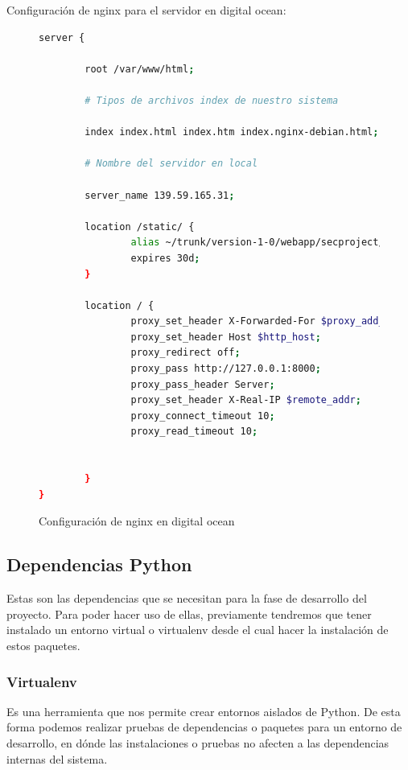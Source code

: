 Configuración de nginx para el servidor en digital ocean:

\begin{figure}[H]
\begin{lstlisting}[language=bash]
server {

        root /var/www/html;

        # Tipos de archivos index de nuestro sistema

        index index.html index.htm index.nginx-debian.html;

        # Nombre del servidor en local

        server_name 139.59.165.31;

        location /static/ {
                alias ~/trunk/version-1-0/webapp/secproject/static/;
                expires 30d;
        }

        location / {
                proxy_set_header X-Forwarded-For $proxy_add_x_forwarded_for;
                proxy_set_header Host $http_host;
                proxy_redirect off;
                proxy_pass http://127.0.0.1:8000;
                proxy_pass_header Server;
                proxy_set_header X-Real-IP $remote_addr;
                proxy_connect_timeout 10;
                proxy_read_timeout 10;


        }
}
\end{lstlisting}
\caption{Configuración de nginx en digital ocean}
\end{figure}

\subsection{Dependencias Python}

Estas son las dependencias que se necesitan para la fase de desarrollo del proyecto. Para poder hacer uso de ellas, previamente tendremos que tener instalado un entorno virtual o virtualenv desde el cual hacer la instalación de estos paquetes.

\subsubsection{Virtualenv}

Es una herramienta que nos permite crear entornos aislados de Python. De esta forma podemos realizar pruebas de dependencias o paquetes para un entorno de desarrollo, en dónde las instalaciones o pruebas no afecten a las dependencias internas del sistema.\\

